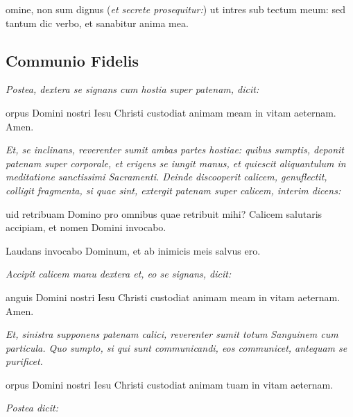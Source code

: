\sinus\sinus\sinus


omine, non sum dignus (\textit{et secrete prosequitur:}) ut intres
sub tectum meum: sed tantum dic verbo, et sanabitur anima mea.

\subsection{Communio Fidelis}

\textit{Postea, dextera se signans cum hostia super patenam, dicit:}

orpus Domini nostri Iesu Christi custodiat animam meam in vitam
aeternam.  Amen.

\textit{%
    Et, se inclinans, reverenter sumit ambas partes hostiae: quibus sumptis,
    deponit patenam super corporale, et erigens se iungit manus, et quiescit
    aliquantulum in meditatione sanctissimi Sacramenti.  Deinde discooperit
    calicem, genuflectit, colligit fragmenta, si quae sint, extergit patenam
    super calicem, interim dicens:
}


uid retribuam Domino pro omnibus quae retribuit mihi?  Calicem
salutaris accipiam, et nomen Domini invocabo.


Laudans invocabo Dominum, et ab inimicis meis salvus ero.

\textit{Accipit calicem manu dextera et, eo se signans, dicit:}

anguis Domini nostri Iesu Christi custodiat animam meam in vitam
aeternam.  Amen.

\textit{%
    Et, sinistra supponens patenam calici, reverenter sumit totum Sanguinem cum
    particula.  Quo sumpto, si qui sunt communicandi, eos communicet, antequam
    se purificet.
}


orpus Domini nostri Iesu Christi custodiat animam tuam in vitam
aeternam.

\vspace{0.5\baselineskip}

\textit{Postea dicit:}


